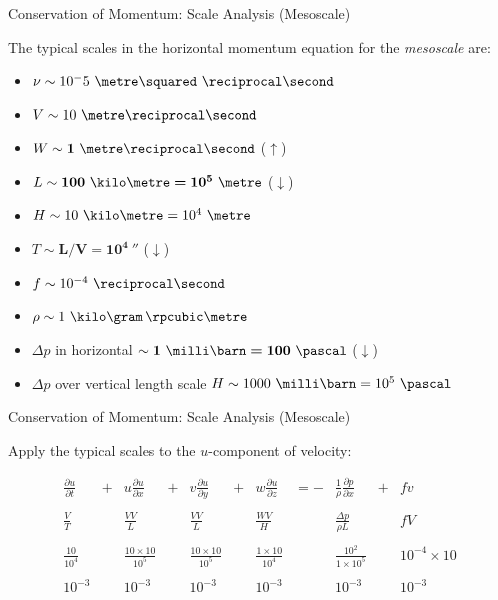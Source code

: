 \begin{frame}{Conservation of Momentum: Scale Analysis (Mesoscale)}

The typical scales in the horizontal momentum equation for the \textit{mesoscale} are:

\begin{itemize}
\item $\nu \sim 10^-5\ \metre\squared\ \reciprocal\second$
\item $V \sim 10\ \metre\reciprocal\second$
\item $W \sim \bm{1\ \metre\reciprocal\second}$ ($\bm{\uparrow}$)
\item $L \sim \bm{100\ \kilo\metre = 10^5\ \metre}$ ($\bm{\downarrow}$)
\item $H \sim 10\ \kilo\metre = 10^4\ \metre$
\item $T \sim \bm{L/V = 10^4\ \second}$ ($\bm{\downarrow}$)
\item $f \sim 10^{-4}\ \reciprocal\second$
\item $\rho \sim 1\ \kilo\gram \, \rpcubic\metre$
\item $\Delta p$ in horizontal $\sim \bm{1\ \milli\barn = 100\ \pascal}$ ($\bm{\downarrow}$)
\item $\Delta p$ over vertical length scale $H \sim 1000\ \milli\barn = 10^5\ \pascal$
\end{itemize}
\end{frame}

\begin{frame}{Conservation of Momentum: Scale Analysis (Mesoscale)}

Apply the typical scales to the $u$-component of velocity:

\begin{align*}
&\frac{\partial u}{\partial t}& + &u \frac{\partial u}{\partial x}& + &v \frac{\partial u}{\partial y}&+ &w \frac{\partial u}{\partial z}& = -& \frac{1}{\rho} \frac{\partial p}{\partial x}& + &fv& \\\\
&\frac{V}{T}&  &\frac{VV}{L}& &\frac{VV}{L}& &\frac{WV}{H}& &\frac{\Delta p}{\rho L}& &fV&\\\\
&\frac{10}{10^4}& &\frac{10\times10}{10^5}& &\frac{10\times10}{10^5}& &\frac{1 \times 10}{10^4}& &\frac{10^2}{1 \times 10^5}& &10^{-4} \times 10&\\\\
&10^{-3}& &10^{-3}& &10^{-3}& &10^{-3}& &10^{-3}& &10^{-3}&
\end{align*}
\end{frame}

